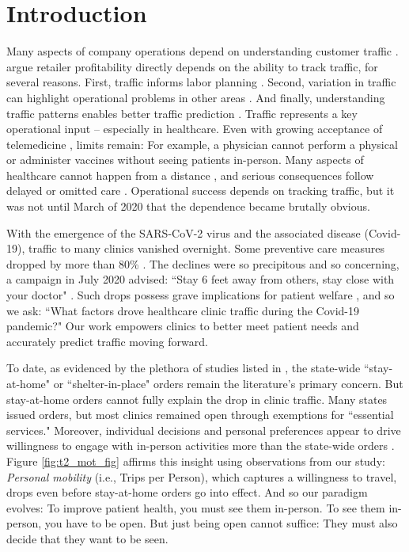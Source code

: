 \section{Introduction}
 Many aspects of company operations depend on understanding customer traffic \citep{Gallino2014}. \cite{Perdikaki2012} argue retailer profitability directly depends on the ability to track traffic, for several reasons. First, traffic informs labor planning \citep{Mani2015,Chuang2015,Perdikaki2017,Netessine2010}. Second, variation in traffic can highlight operational problems in other areas \citep{Lee2017}. And finally, understanding traffic patterns enables better traffic prediction \citep{Yung2020,Kamalahmadi2021,Abrishami2018}. Traffic represents a key operational input -- especially in healthcare. Even with growing acceptance of telemedicine \citep{WSJ_21_telemed,Friedman2021}, limits remain: For example, a physician cannot perform a physical or administer vaccines without seeing patients in-person. Many aspects of healthcare cannot happen from a distance \citep{Romanick-Schmiedl2020}, and serious consequences follow delayed or omitted care \citep{Findling2020,CDC_ExcessDeath}. Operational success depends on tracking traffic, but it was not until March of 2020 that the dependence became brutally obvious.
 
 With the emergence of the SARS-CoV-2 virus and the associated disease (Covid-19), traffic to many clinics vanished overnight. Some preventive care measures dropped by more than 80\% \citep{Cantor2020}. The declines were so precipitous and so concerning, a campaign in July 2020 advised: “Stay 6 feet away from others, stay close with your doctor" \citep{StopMedicalDistancing.org}. Such drops possess grave implications for patient welfare \citep{WSJ_skipDoc}, and so we ask: “What factors drove healthcare clinic traffic during the Covid-19 pandemic?" Our work empowers clinics to better meet patient needs \citep[as in][]{Musalem2020} and accurately predict traffic moving forward. 

 To date, as evidenced by the plethora of studies listed in \cite{Gupta2020}, the state-wide “stay-at-home" or “shelter-in-place" orders remain the literature's primary concern. But stay-at-home orders cannot fully explain the drop in clinic traffic. Many states issued orders, but most clinics remained open through exemptions for “essential services." Moreover, individual decisions and personal preferences appear to drive willingness to engage with in-person activities more than the state-wide orders \citep{Goolsbee2020_key}. Figure \ref{fig:t2_mot_fig} affirms this insight using observations from our study: \textit{Personal mobility} (i.e., Trips per Person), which captures a willingness to travel, drops even before stay-at-home orders go into effect. And so our paradigm evolves: To improve patient health, you must see them in-person. To see them in-person, you have to be open. But just being open cannot suffice: They must also decide that they want to be seen.
 
